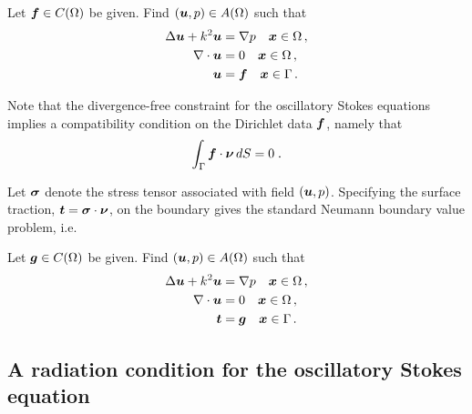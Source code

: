 \begin{definition}
  Let ${\boldsymbol f} \in C(\Omega)$ be given. Find $({\boldsymbol u},p) \in A(\Omega)$
  such that
  \begin{equation}
  \begin{aligned} \label{eq:dir_interior}
    \Delta {\boldsymbol u} + k^{2} {\boldsymbol u} &= \nabla p \quad {\boldsymbol x} \in \Omega \, ,\\
    \nabla \cdot {\boldsymbol u} &= 0 \quad {\boldsymbol x} \in \Omega \, ,  \\
    {\boldsymbol u} &= {\boldsymbol f} \quad {\boldsymbol x} \in \Gamma \, .
  \end{aligned}
  \end{equation}
\end{definition}
Note that the divergence-free constraint for the oscillatory
Stokes equations implies a compatibility condition on the
Dirichlet data ${\boldsymbol f}$, namely that
\begin{equation} \label{eq:dir_compat}
  \int_\Gamma {\boldsymbol f} \cdot {\boldsymbol \nu} \, dS = 0 \; .
\end{equation}


Let ${\boldsymbol \sigma}$ denote the stress tensor associated with
field $({\boldsymbol u},p)$. 
Specifying the surface traction, ${\boldsymbol t} = {\boldsymbol \sigma} \cdot {\boldsymbol \nu}$,
on the boundary gives the standard Neumann boundary value
problem, i.e.

\begin{definition}
  Let ${\boldsymbol g} \in C(\Omega)$ be given. Find $({\boldsymbol u},p) \in A(\Omega)$
  such that
  \begin{equation}
  \begin{aligned} \label{eq:neu_interior}
    \Delta {\boldsymbol u} + k^{2} {\boldsymbol u} &= \nabla p \quad {\boldsymbol x} \in \Omega \, ,\\
    \nabla \cdot {\boldsymbol u} &= 0 \quad {\boldsymbol x} \in \Omega \, ,  \\
    {\boldsymbol t} &= {\boldsymbol g} \quad {\boldsymbol x} \in \Gamma \, .
  \end{aligned}
  \end{equation}
\end{definition}

\subsection{A radiation condition for the oscillatory Stokes
  equation}

